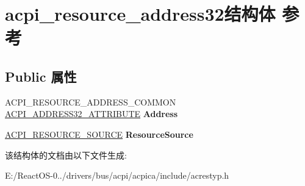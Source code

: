 \hypertarget{structacpi__resource__address32}{}\section{acpi\+\_\+resource\+\_\+address32结构体 参考}
\label{structacpi__resource__address32}
\subsection*{Public 属性}
\begin{DoxyCompactItemize}
\item 
\mbox{\label{structacpi__resource__address32_a25fa02644cc23458f66285d9cb0a4fd5}} 
A\+C\+P\+I\+\_\+\+R\+E\+S\+O\+U\+R\+C\+E\+\_\+\+A\+D\+D\+R\+E\+S\+S\+\_\+\+C\+O\+M\+M\+ON \hyperlink{structacpi__address32__attribute}{A\+C\+P\+I\+\_\+\+A\+D\+D\+R\+E\+S\+S32\+\_\+\+A\+T\+T\+R\+I\+B\+U\+TE} {\bfseries Address}
\item 
\mbox{\label{structacpi__resource__address32_a301c9378ac0dafee6e0a2645c093f3f0}} 
\hyperlink{structacpi__resource__source}{A\+C\+P\+I\+\_\+\+R\+E\+S\+O\+U\+R\+C\+E\+\_\+\+S\+O\+U\+R\+CE} {\bfseries Resource\+Source}
\end{DoxyCompactItemize}


该结构体的文档由以下文件生成\+:\begin{DoxyCompactItemize}
\item 
E\+:/\+React\+O\+S-\/0../drivers/bus/acpi/acpica/include/acrestyp.\+h\end{DoxyCompactItemize}
